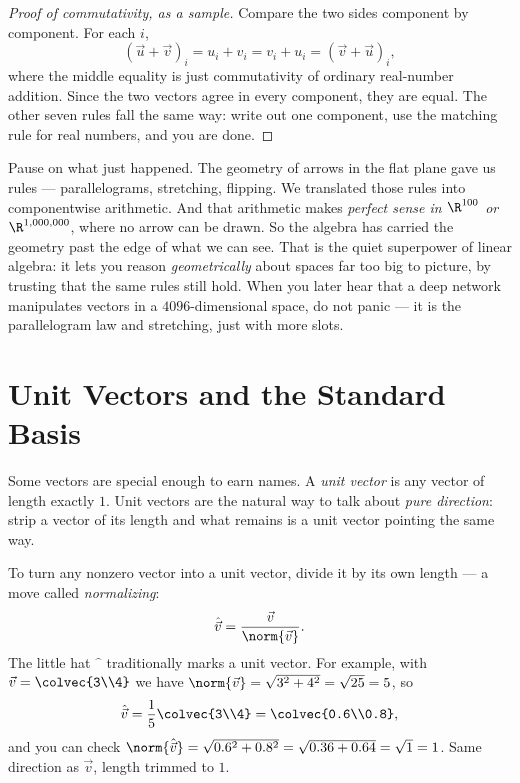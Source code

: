 \begin{proof}[Proof of commutativity, as a sample]
Compare the two sides component by component. For each $i$,
\[
  (\vec{u}+\vec{v})_i = u_i + v_i = v_i + u_i = (\vec{v}+\vec{u})_i,
\]
where the middle equality is just commutativity of ordinary real-number addition. Since
the two vectors agree in every component, they are equal. The other seven rules fall the
same way: write out one component, use the matching rule for real numbers, and you are
done.
\end{proof}

\begin{aestheticbox}
Pause on what just happened. The geometry of arrows in the flat plane gave us rules ---
parallelograms, stretching, flipping. We translated those rules into componentwise
arithmetic. And that arithmetic makes \emph{perfect sense in $\R^{100}$ or $\R^{1{,}000{,}000}$},
where no arrow can be drawn. So the algebra has carried the geometry past the edge of what
we can see. That is the quiet superpower of linear algebra: it lets you reason
\emph{geometrically} about spaces far too big to picture, by trusting that the same rules
still hold. When you later hear that a deep network manipulates vectors in a
$4096$-dimensional space, do not panic --- it is the parallelogram law and stretching,
just with more slots.
\end{aestheticbox}

\section{Unit Vectors and the Standard Basis}
\label{ch02:basis}

Some vectors are special enough to earn names. A \emph{unit vector} is any vector of
length exactly $1$. Unit vectors are the natural way to talk about \emph{pure direction}:
strip a vector of its length and what remains is a unit vector pointing the same way.

To turn any nonzero vector into a unit vector, divide it by its own length --- a move
called \emph{normalizing}:
\[
  \hat{\vec{v}} = \frac{\vec{v}}{\norm{\vec{v}}}.
\]
The little hat $\hat{\phantom{v}}$ traditionally marks a unit vector. For example, with
$\vec{v}=\colvec{3\\4}$ we have $\norm{\vec{v}}=\sqrt{3^2+4^2}=\sqrt{25}=5$, so
\[
  \hat{\vec{v}} = \frac{1}{5}\colvec{3\\4} = \colvec{0.6\\0.8},
\]
and you can check $\norm{\hat{\vec{v}}} = \sqrt{0.6^2 + 0.8^2} = \sqrt{0.36+0.64}
= \sqrt{1} = 1$. Same direction as $\vec{v}$, length trimmed to $1$.

